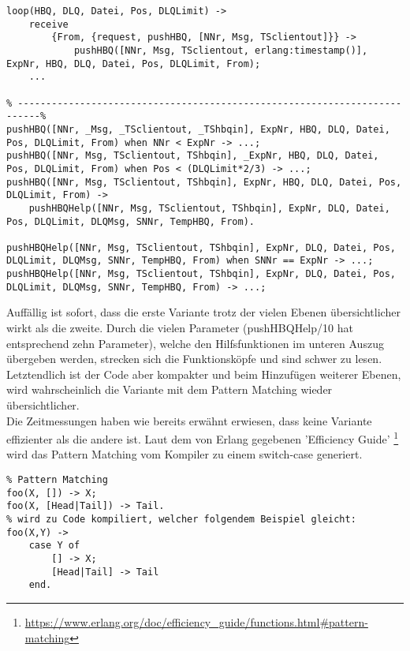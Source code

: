 \begin{lstlisting}
loop(HBQ, DLQ, Datei, Pos, DLQLimit) ->
	receive
		{From, {request, pushHBQ, [NNr, Msg, TSclientout]}} ->
			pushHBQ([NNr, Msg, TSclientout, erlang:timestamp()], ExpNr, HBQ, DLQ, Datei, Pos, DLQLimit, From);
    ...
    
% --------------------------------------------------------------------------%
pushHBQ([NNr, _Msg, _TSclientout, _TShbqin], ExpNr, HBQ, DLQ, Datei, Pos, DLQLimit, From) when NNr < ExpNr -> ...;
pushHBQ([NNr, Msg, TSclientout, TShbqin], _ExpNr, HBQ, DLQ, Datei, Pos, DLQLimit, From) when Pos < (DLQLimit*2/3) -> ...;
pushHBQ([NNr, Msg, TSclientout, TShbqin], ExpNr, HBQ, DLQ, Datei, Pos, DLQLimit, From) ->
	pushHBQHelp([NNr, Msg, TSclientout, TShbqin], ExpNr, DLQ, Datei, Pos, DLQLimit, DLQMsg, SNNr, TempHBQ, From).

pushHBQHelp([NNr, Msg, TSclientout, TShbqin], ExpNr, DLQ, Datei, Pos, DLQLimit, DLQMsg, SNNr, TempHBQ, From) when SNNr == ExpNr -> ...;
pushHBQHelp([NNr, Msg, TSclientout, TShbqin], ExpNr, DLQ, Datei, Pos, DLQLimit, DLQMsg, SNNr, TempHBQ, From) -> ...;
\end{lstlisting}

Auffällig ist sofort, dass die erste Variante trotz der vielen Ebenen übersichtlicher wirkt als die zweite. Durch die vielen Parameter (pushHBQHelp/10 hat entsprechend zehn Parameter), welche den Hilfsfunktionen im unteren Auszug übergeben werden, strecken sich die Funktionsköpfe und sind schwer zu lesen. Letztendlich ist der Code aber kompakter und beim Hinzufügen weiterer Ebenen, wird wahrscheinlich die Variante mit dem Pattern Matching wieder übersichtlicher.\\
Die Zeitmessungen haben wie bereits erwähnt erwiesen, dass keine Variante effizienter als die andere ist. 
Laut dem von Erlang gegebenen 'Efficiency Guide' \footnote{\url{https://www.erlang.org/doc/efficiency_guide/functions.html#pattern-matching}} wird das Pattern Matching vom Kompiler zu einem switch-case generiert. 

\begin{lstlisting}
% Pattern Matching
foo(X, []) -> X;
foo(X, [Head|Tail]) -> Tail.
% wird zu Code kompiliert, welcher folgendem Beispiel gleicht:
foo(X,Y) ->
    case Y of
        [] -> X;
        [Head|Tail] -> Tail
    end.
\end{lstlisting}

